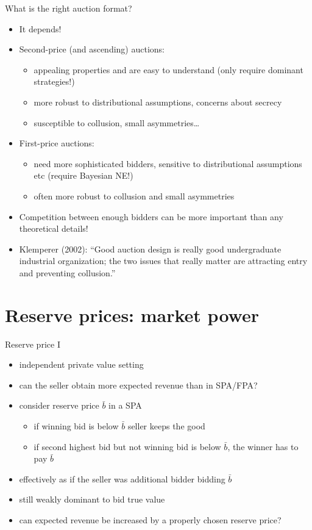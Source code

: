 \documentclass[bigger]{beamer}
\begin{document}
\begin{frame}[label={sec:org3f98fbf}]{What is the right auction format?}
\begin{itemize}
\item It depends!
\item Second-price (and ascending) auctions:
\begin{itemize}
\item appealing properties and are easy to understand (only require dominant strategies!)
\item more robust to distributional assumptions, concerns about secrecy
\item susceptible to collusion, small asymmetries\ldots{}
\end{itemize}
\item First-price auctions:
\begin{itemize}
\item need more sophisticated bidders, sensitive to distributional assumptions etc (require Bayesian NE!)
\item often more robust to collusion and small asymmetries
\end{itemize}
\item Competition between enough bidders can be more important than any theoretical details!
\item Klemperer (2002): “Good auction design is really good undergraduate industrial organization; the two issues that really matter are attracting entry and preventing collusion.”
\end{itemize}
\end{frame}

\section{Reserve prices: market power}
\label{sec:org19b2b69}
\begin{frame}[label={sec:orgc407194}]{Reserve price I}
\begin{itemize}
\item independent private value setting
\item can the seller obtain more expected revenue than in SPA/FPA?
\item consider reserve price \(\bar b\) in a SPA
\begin{itemize}
\item if winning bid is below \(\bar b\) seller keeps the good
\item if second highest bid but not winning bid is below \(\bar b\), the winner has to pay \(\bar b\)
\end{itemize}
\item effectively as if the seller was additional bidder bidding \(\bar b\)
\item still weakly dominant to bid true value
\item can expected revenue be increased by a properly chosen reserve price?
\end{itemize}
\end{frame}
\end{document}
